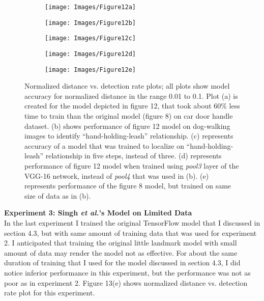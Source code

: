 \documentclass [11pt,letterpaper ,twoside ,openany ]{report}
\begin{document}
    \begin{figure}[h!]
    \centering
        \begin{subfigure}[b]{.45\linewidth}
            \texttt{[image: Images/Figure12a]}
            \caption{}
        \end{subfigure}

        \begin{subfigure}[b]{.45\linewidth}
            \texttt{[image: Images/Figure12b]}
            \caption{}
        \end{subfigure}
        \begin{subfigure}[b]{.45\linewidth}
            \texttt{[image: Images/Figure12c]}
            \caption{}
        \end{subfigure}        

        \begin{subfigure}[b]{.45\linewidth}
            \texttt{[image: Images/Figure12d]}
            \caption{}
        \end{subfigure}
        \begin{subfigure}[b]{.45\linewidth}
            \texttt{[image: Images/Figure12e]}
            \caption{}
        \end{subfigure}                
        \caption{Normalized distance vs. detection rate plots; all plots show model accuracy for normalized distance in the range 0.01 to 0.1. Plot (a) is created for the model depicted in figure 12, that took about 60\% less time to train than the original model (figure 8) on car door handle dataset. (b) shows performance of figure 12 model on dog-walking images to identify ``hand-holding-leash'' relationship. (c) represents accuracy of a model that was trained to localize on ``hand-holding-leash'' relationship in five steps, instead of three. (d) represents performance of figure 12 model when trained using \textit{pool3} layer of the VGG-16 network, instead of \textit{pool4} that was used in (b). (e) represents performance of the figure 8 model, but trained on same size of data as in (b).}
    \end{figure}   

    \noindent
    \textbf{Experiment 3: Singh \textit{et al.}'s Model on Limited Data}\\             
    In the last experiment I trained the original TensorFlow model that I discussed in section 4.3, but with same amount of training data that was used for experiment 2. I anticipated that training the original little landmark model with small amount of data may render the model not as effective. For about the same duration of training that I used for the model discussed in section 4.3, I did notice inferior performance in this experiment, but the performance was not as poor as in experiment 2. Figure 13(e) shows normalized distance vs. detection rate plot for this experiment. 
\end{document}
